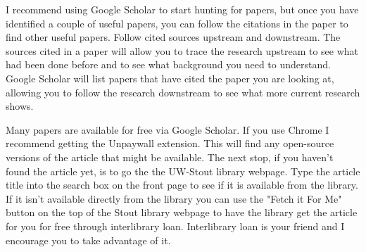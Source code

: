 \documentclass[12pt, letterpaper]{article}
\begin{document}
I recommend using Google Scholar to start hunting for papers, but once you have identified a couple of useful papers, you can follow the citations in the paper to find other useful papers.  Follow cited sources upstream and downstream.  The sources cited in a paper will allow you to trace the research upstream to see what had been done before and to see what background you need to understand.  Google Scholar will list papers that have cited the paper you are looking at, allowing you to follow the research downstream to see what more current research shows.

Many papers are available for free via Google Scholar.  If you use Chrome I recommend getting the Unpaywall extension.  This will find any open-source versions of the article that might be available.  The next stop, if you haven't found the article yet, is to go the the UW-Stout library webpage.  Type the article title into the search box on the front page to see if it is available from the library.  If it isn't available directly from the library you can use the "Fetch it For Me" button on the top of the Stout library webpage to have the library get the article for you for free through interlibrary loan.  Interlibrary loan is your friend and I encourage you to take advantage of it.  

 
\end{document}
